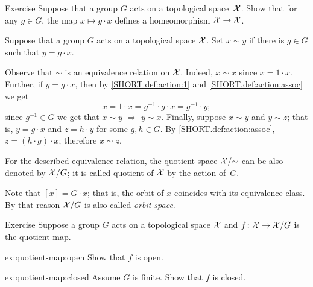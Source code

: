 \begin{thm}{Exercise}\label{ex:g-homeo}
Suppose that a group $G$ acts on a topological space~$\mathcal{X}$.
Show that for any $g\in G$, the map $x\mapsto g\cdot x$ defines a homeomorphism $\mathcal{X}\to \mathcal{X}$.
\end{thm}

Suppose that a group $G$ acts on a topological space $\mathcal{X}$.
Set $x\sim y$ if there is $g\in G$ such that $y=g\cdot x$.

Observe that $\sim$ is an equivalence relation on $\mathcal{X}$.
Indeed, 
$x\sim x$ since $x=1\cdot x$.
Further, if $y=g\cdot x$, then by \ref{SHORT.def:action:1} and \ref{SHORT.def:action:assoc} we get
\[x=1\cdot x=g^{-1}\cdot g\cdot  x=g^{-1}\cdot y;\] since $g^{-1}\in G$ we get that $x\sim y$
$\Longrightarrow$
$y\sim x$.
Finally, suppose $x\sim y$ and $y\sim z$;
that is, $y=g\cdot x$ and $z=h\cdot y$ for some $g,h\in G$.
By \ref{SHORT.def:action:assoc}, $z=(h\cdot g)\cdot x$;
therefore $x\sim z$.

For the described equivalence relation, the quotient space $\mathcal{X}/{\sim}$ can be also denoted by $\mathcal{X}/G$;
it is called quotient of $\mathcal{X}$ by the action of~$G$.

Note that $[x]=G\cdot x$; that is, the orbit of $x$ coincides with its equivalence class.
By that reason $\mathcal{X}/G$ is also called \emph{orbit space}.

\begin{thm}{Exercise}\label{ex:quotient-map}
Suppose a group $G$ acts on a topological space $\mathcal{X}$ and $f\colon\mathcal{X}\to \mathcal{X}/G$ is the quotient map.

\begin{subthm}{ex:quotient-map:open}
Show that $f$ is open.
\end{subthm}

\begin{subthm}{ex:quotient-map:closed}
Assume $G$ is finite.
Show that $f$ is closed.
\end{subthm}

\end{thm}

